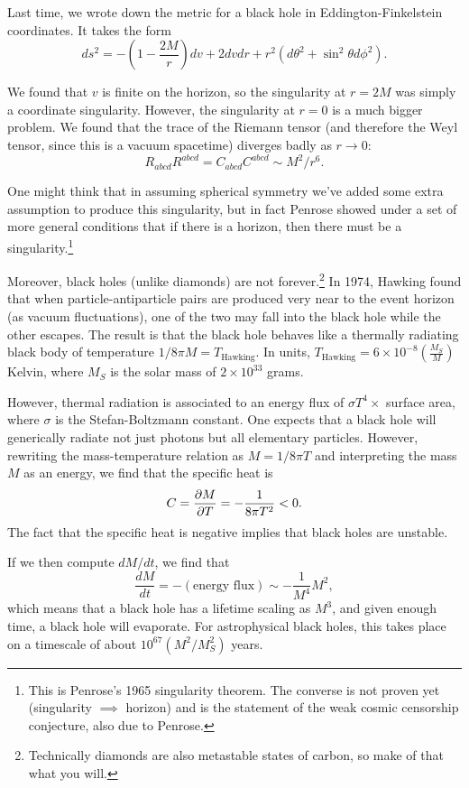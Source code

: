 Last time, we wrote down the metric for a black hole in Eddington-Finkelstein coordinates. It takes the form
$$ds^2=-\left(1-\frac{2M}{r}\right) dv+2dvdr+r^2 (d\theta^2+\sin^2 \theta d\phi^2).$$

We found that $v$ is finite on the horizon, so the singularity at $r=2M$ was simply a coordinate singularity. However, the singularity at $r=0$ is a much bigger problem. We found that the trace of the Riemann tensor (and therefore the Weyl tensor, since this is a vacuum spacetime) diverges badly as $r\to 0$:
$$R_{abcd}R^{abcd}=C_{abcd}C^{abcd}\sim M^2/r^6.$$

One might think that in assuming spherical symmetry we've added some extra assumption to produce this singularity, but in fact Penrose showed under a set of more general conditions that if there is a horizon, then there must be a singularity.\footnote{This is Penrose's 1965 singularity theorem. The converse is not proven yet (singularity $\implies$ horizon) and is the statement of the weak cosmic censorship conjecture, also due to Penrose.}

Moreover, black holes (unlike diamonds) are not forever.\footnote{Technically diamonds are also metastable states of carbon, so make of that what you will.} In 1974, Hawking found that when particle-antiparticle pairs are produced very near to the event horizon (as vacuum fluctuations), one of the two may fall into the black hole while the other escapes. The result is that the black hole behaves like a thermally radiating black body of temperature $1/8\pi M=T_{\text{Hawking}}$. In units, $T_{\text{Hawking}}=6\times 10^{-8}\left(\frac{M_S}{M}\right)$ Kelvin, where $M_S$ is the solar mass of $2\times 10^{33}$ grams.

However, thermal radiation is associated to an energy flux of $\sigma T^4\times$ surface area, where $\sigma$ is the Stefan-Boltzmann constant. One expects that a black hole will generically radiate not just photons but all elementary particles. However, rewriting the mass-temperature relation as $M=1/8\pi T$ and interpreting the mass $M$ as an energy, we find that the specific heat is
$$C=\P{M}{T}=-\frac{1}{8\pi T^2}<0.$$
The fact that the specific heat is negative implies that black holes are unstable.

If we then compute $dM/dt$, we find that
$$\frac{dM}{dt}=-(\text{energy flux})\sim -\frac{1}{M^4}M^2,$$
which means that a black hole has a lifetime scaling as $M^3$, and given enough time, a black hole will evaporate. For astrophysical black holes, this takes place on a timescale of about $10^{67}(M^2/M_S^2)$ years.

